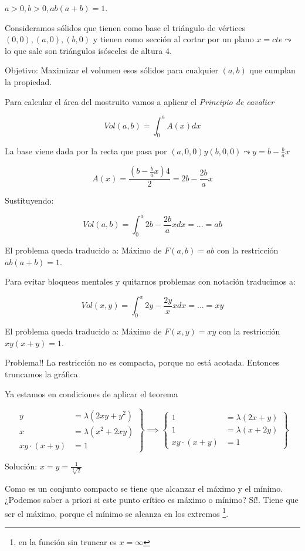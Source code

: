 \begin{problem}[?]

$a>0,b>0, ab(a+b) = 1$.

Consideramos sólidos que tienen como base el triángulo de vértices $(0,0),(a,0),(b,0)$ y tienen como sección al cortar por un plano $x=cte \leadsto$ lo que sale son triángulos isósceles de altura 4.

Objetivo: Maximizar el volumen esos sólidos para cualquier $(a,b)$ que cumplan la propiedad.
\solution



Para calcular el área del mostruito vamos a aplicar el \textit{Principio de cavalier} 

\[Vol(a,b) = \int_0^a A(x)dx\]

La base viene dada por la recta que pasa por $(a,0,0) y (b,0,0) \leadsto y=b-\frac{b}{a}x$

\[A(x) = \displaystyle \frac{\left(b-\frac{b}{a}x\right)4}{2} = 2b - \frac{2b}{a}x\]

Sustituyendo:


\[Vol(a,b) = \int_0^a 2b-\frac{2b}{a}xdx = ... = ab\]

El problema queda traducido a: Máximo de $F(a,b) = ab$ con la restricción $ab(a+b)=1$.

Para evitar bloqueos mentales y quitarnos problemas con notación traducimos a:

\[Vol(x,y) = \int_0^x 2y-\frac{2y}{x}xdx = ... = xy\]

El problema queda traducido a: Máximo de $F(x,y) = xy$ con la restricción $xy(x+y)=1$.

Problema!! La restricción no es compacta, porque no está acotada. Entonces truncamos la gráfica

Ya estamos en condiciones de aplicar el teorema

\[\left.\begin{array}{cc} y&= \lambda (2xy + y^2)\\
x&= \lambda(x^2+2xy)\\
xy\cdot(x+y) &= 1\end{array}\right\}\implies
\left\{
\begin{array}{cc}
1&= \lambda(2x+y)\\
1&= \lambda(x+2y)\\
xy\cdot(x+y) &= 1
\end{array}\right\} 
\]

Solución: $x=y = \frac{1}{\sqrt[3]{2}}$

Como es un conjunto compacto se tiene que alcanzar el máximo y el mínimo. ¿Podemos saber a priori si este punto crítico es máximo o mínimo? Sí!. Tiene que ser el máximo, porque el mínimo se alcanza en los extremos \footnote{en la función sin truncar es $x  = \infty$}.






\end{problem}